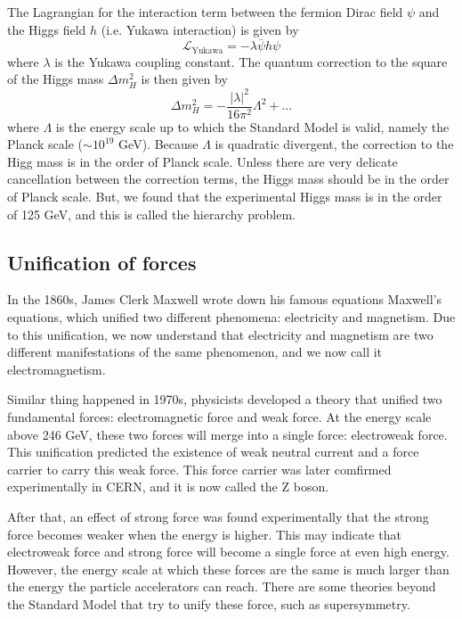 The Lagrangian for the interaction term between the fermion Dirac field $\psi$ and the Higgs field $h$ (i.e. Yukawa interaction) is given by
\begin{equation}
\mathcal{L}_{\text{Yukawa}} = - \lambda \bar{\psi} h \psi
\end{equation}
where $\lambda$ is the Yukawa coupling constant.
The quantum correction to the square of the Higgs mass $\Delta m^2_H$ is then given by
\begin{equation}
\Delta m^2_H = - \frac{|\lambda|^2}{16 \pi^2} \Lambda^2 + \dots
\label{eq:higgs_correction}
\end{equation}
where $\Lambda$ is the energy scale up to which the Standard Model is valid, namely the Planck scale ($\sim 10^{19}$ GeV).
Because $\Lambda$ is quadratic divergent, the correction to the Higg mass is in the order of Planck scale.
Unless there are very delicate cancellation between the correction terms, the Higgs mass should be in the order of Planck scale.
But, we found that the experimental Higgs mass is in the order of 125 GeV, and this is called the hierarchy problem.

\subsection{Unification of forces}
In the 1860s, James Clerk Maxwell wrote down his famous equations Maxwell's equations, which unified two different phenomena: electricity and magnetism.
Due to this unification, we now understand that electricity and magnetism are two different manifestations of the same phenomenon, and we now call it electromagnetism.

Similar thing happened in 1970s, physicists developed a theory that unified two fundamental forces: electromagnetic force and weak force.
At the energy scale above 246 GeV, these two forces will merge into a single force: electroweak force.
This unification predicted the existence of weak neutral current and a force carrier to carry this weak force.
This force carrier was later comfirmed experimentally in CERN, and it is now called the Z boson.

After that, an effect of strong force was found experimentally that the strong force becomes weaker when the energy is higher.
This may indicate that electroweak force and strong force will become a single force at even high energy.
However, the energy scale at which these forces are the same is much larger than the energy the particle accelerators can reach.
There are some theories beyond the Standard Model that try to unify these force, such as supersymmetry.

